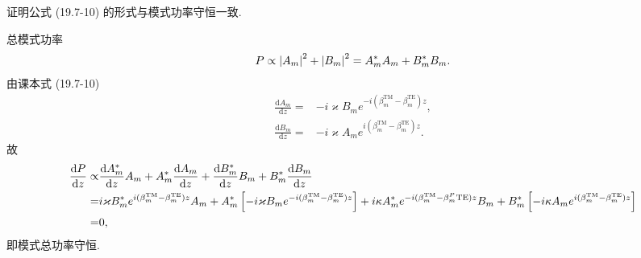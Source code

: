 \documentclass{note}
\begin{document}
\begin{exe}
    证明公式 (19.7-10) 的形式与模式功率守恒一致.
\end{exe}
\begin{pf}
    总模式功率
    \begin{align}
        P\propto\left\lvert A_m\right\rvert^2+\left\lvert B_m\right\rvert^2=A_m^*A_m+B_m^*B_m.
    \end{align}
    由课本式 (19.7-10)
    \begin{align}
        \frac{\mathrm{d}A_m}{\mathrm{d}z}=&-i\varkappa B_me^{-i(\beta_m^{\text{TM}}-\beta_m^{\text{TE}})z},\\
        \frac{\mathrm{d}B_m}{\mathrm{d}z}=&-i\varkappa A_me^{i(\beta_m^{\text{TM}}-\beta_m^{\text{TE}})z}.
    \end{align}
    故
    \begin{align}
        \notag\frac{\mathrm{d}P}{\mathrm{d}z}\propto&\frac{\mathrm{d}A_m^*}{\mathrm{d}z}A_m+A_m^*\frac{\mathrm{d}A_m}{\mathrm{d}z}+\frac{\mathrm{d}B_m^*}{\mathrm{d}z}B_m+B_m^*\frac{\mathrm{d}B_m}{\mathrm{d}z}\\
        \notag=&i\varkappa B_m^*e^{i(\beta_m^{\text{TM}}-\beta_m^{\text{TE}})z}A_m+A_m^*\left[-i\varkappa B_me^{-i(\beta_m^{\text{TM}}-\beta_m^{\text{TE}})z}\right]+i\kappa A_m^*e^{-i(\beta_m^{\text{TM}}-\beta_m^P\text{TE})z}B_m+B_m^*\left[-i\kappa A_me^{i(\beta_m^{\text{TM}}-\beta_m^{\text{TE}})z}\right]\\
        =&0,
    \end{align}
    即模式总功率守恒.
\end{pf}
\end{document}
